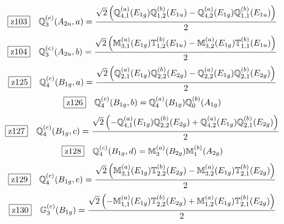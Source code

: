 \documentclass[fleqn,10pt,landscape]{jsarticle}
\begin{document}
\begin{dmath*}
\hspace*{3mm}\fbox{z103}\quad \mathbb{Q}_{3}^{(c)}(A_{2u},a)=\frac{\sqrt{2} \left(\mathbb{Q}_{4,1}^{(a)}(E_{1g}) \mathbb{Q}_{1,2}^{(b)}(E_{1u}) - \mathbb{Q}_{4,2}^{(a)}(E_{1g}) \mathbb{Q}_{1,1}^{(b)}(E_{1u})\right)}{2}
\end{dmath*}
\begin{dmath*}
\hspace*{3mm}\fbox{z104}\quad \mathbb{Q}_{3}^{(c)}(A_{2u},b)=\frac{\sqrt{2} \left(\mathbb{M}_{3,1}^{(a)}(E_{1g}) \mathbb{T}_{1,2}^{(b)}(E_{1u}) - \mathbb{M}_{3,2}^{(a)}(E_{1g}) \mathbb{T}_{1,1}^{(b)}(E_{1u})\right)}{2}
\end{dmath*}
\begin{dmath*}
\hspace*{3mm}\fbox{z125}\quad \mathbb{Q}_{4}^{(c)}(B_{1g},a)=\frac{\sqrt{2} \left(\mathbb{Q}_{2,1}^{(a)}(E_{1g}) \mathbb{Q}_{2,2}^{(b)}(E_{2g}) - \mathbb{Q}_{2,2}^{(a)}(E_{1g}) \mathbb{Q}_{2,1}^{(b)}(E_{2g})\right)}{2}
\end{dmath*}
\begin{dmath*}
\hspace*{3mm}\fbox{z126}\quad \mathbb{Q}_{4}^{(c)}(B_{1g},b)=\mathbb{Q}_{4}^{(a)}(B_{1g}) \mathbb{Q}_{0}^{(b)}(A_{1g})
\end{dmath*}
\begin{dmath*}
\hspace*{3mm}\fbox{z127}\quad \mathbb{Q}_{4}^{(c)}(B_{1g},c)=\frac{\sqrt{2} \left(- \mathbb{Q}_{4,1}^{(a)}(E_{1g}) \mathbb{Q}_{2,2}^{(b)}(E_{2g}) + \mathbb{Q}_{4,2}^{(a)}(E_{1g}) \mathbb{Q}_{2,1}^{(b)}(E_{2g})\right)}{2}
\end{dmath*}
\begin{dmath*}
\hspace*{3mm}\fbox{z128}\quad \mathbb{Q}_{4}^{(c)}(B_{1g},d)=\mathbb{M}_{3}^{(a)}(B_{2g}) \mathbb{M}_{1}^{(b)}(A_{2g})
\end{dmath*}
\begin{dmath*}
\hspace*{3mm}\fbox{z129}\quad \mathbb{Q}_{4}^{(c)}(B_{1g},e)=\frac{\sqrt{2} \left(\mathbb{M}_{3,1}^{(a)}(E_{1g}) \mathbb{T}_{2,2}^{(b)}(E_{2g}) - \mathbb{M}_{3,2}^{(a)}(E_{1g}) \mathbb{T}_{2,1}^{(b)}(E_{2g})\right)}{2}
\end{dmath*}
\begin{dmath*}
\hspace*{3mm}\fbox{z130}\quad \mathbb{G}_{3}^{(c)}(B_{1g})=\frac{\sqrt{2} \left(- \mathbb{M}_{1,1}^{(a)}(E_{1g}) \mathbb{T}_{2,2}^{(b)}(E_{2g}) + \mathbb{M}_{1,2}^{(a)}(E_{1g}) \mathbb{T}_{2,1}^{(b)}(E_{2g})\right)}{2}
\end{dmath*}
\end{document}
